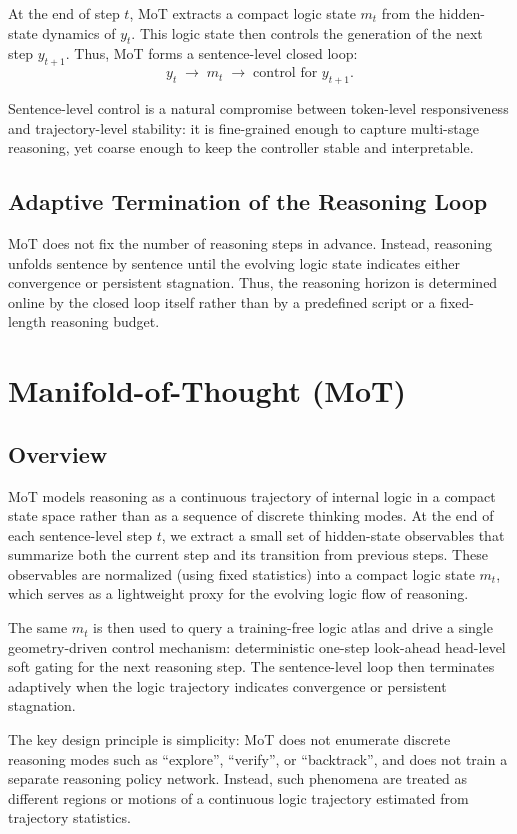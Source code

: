 \documentclass{article}
\begin{document}
At the end of step $t$, MoT extracts a compact logic state $m_t$ from the hidden-state dynamics of $y_t$. 
This logic state then controls the generation of the next step $y_{t+1}$. 
Thus, MoT forms a sentence-level closed loop:
\[
y_t \;\longrightarrow\; m_t \;\longrightarrow\; \text{control for } y_{t+1}.
\]

Sentence-level control is a natural compromise between token-level responsiveness and trajectory-level stability: it is fine-grained enough to capture multi-stage reasoning, yet coarse enough to keep the controller stable and interpretable.

\subsection{Adaptive Termination of the Reasoning Loop}
MoT does not fix the number of reasoning steps in advance. Instead, reasoning unfolds sentence by sentence until the evolving logic state indicates either convergence or persistent stagnation. Thus, the reasoning horizon is determined online by the closed loop itself rather than by a predefined script or a fixed-length reasoning budget.


\section{Manifold-of-Thought (MoT)}
\label{sec:method}

\subsection{Overview}
MoT models reasoning as a continuous trajectory of internal logic in a compact state space rather than as a sequence of discrete thinking modes. 
At the end of each sentence-level step $t$, we extract a small set of hidden-state observables that summarize both the current step and its transition from previous steps. 
These observables are normalized (using fixed statistics) into a compact logic state $m_t$, which serves as a lightweight proxy for the evolving logic flow of reasoning.

The same $m_t$ is then used to query a training-free logic atlas and drive a single geometry-driven control mechanism: deterministic one-step look-ahead head-level soft gating for the next reasoning step. The sentence-level loop then terminates adaptively when the logic trajectory indicates convergence or persistent stagnation.

The key design principle is simplicity: MoT does not enumerate discrete reasoning modes such as ``explore'', ``verify'', or ``backtrack'', and does not train a separate reasoning policy network. Instead, such phenomena are treated as different regions or motions of a continuous logic trajectory estimated from trajectory statistics.
\end{document}
